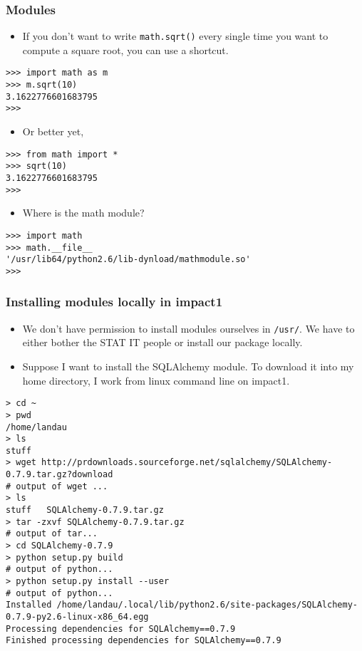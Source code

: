 \documentclass[handout]{beamer}
\numberwithin{equation}{section}
\begin{document}
\begin{frame}[fragile]
\frametitle{Modules}

\begin{itemize}
\item If you don't want to write {\tt math.sqrt()} every single time you want to compute a square root, you can use a shortcut.
\end{itemize}

\begin{lstlisting}[name=ex]
>>> import math as m
>>> m.sqrt(10)
3.1622776601683795
>>> 
\end{lstlisting}

\pause

\begin{itemize}
\item Or better yet, 
\end{itemize}

\begin{lstlisting}[name=ex]
>>> from math import *
>>> sqrt(10)
3.1622776601683795
>>> 
\end{lstlisting}

\pause

\begin{itemize}
\item Where is the math module?
\end{itemize}

\begin{lstlisting}[name=ex]
>>> import math
>>> math.__file__
'/usr/lib64/python2.6/lib-dynload/mathmodule.so'
>>> 
\end{lstlisting}
\end{frame}


\begin{frame}[fragile]
\frametitle{Installing modules locally in impact1}

\begin{itemize}\scriptsize
\item We don't have permission to install modules ourselves in {\tt /usr/}. We have to either bother the STAT IT people or install our package locally.
\pause \item Suppose I want to install the SQLAlchemy module. To download it into my home directory, I work from linux command line on impact1.
\end{itemize}

\lstset{language=bash}
\pause \begin{lstlisting}[name=pkg]
> cd ~
> pwd
/home/landau
> ls
stuff
> wget http://prdownloads.sourceforge.net/sqlalchemy/SQLAlchemy-0.7.9.tar.gz?download
# output of wget ...
> ls
stuff	SQLAlchemy-0.7.9.tar.gz
> tar -zxvf SQLAlchemy-0.7.9.tar.gz 
# output of tar...
> cd SQLAlchemy-0.7.9
> python setup.py build
# output of python...
> python setup.py install --user
# output of python...
Installed /home/landau/.local/lib/python2.6/site-packages/SQLAlchemy-0.7.9-py2.6-linux-x86_64.egg
Processing dependencies for SQLAlchemy==0.7.9
Finished processing dependencies for SQLAlchemy==0.7.9
\end{lstlisting}
\end{frame}
\end{document}
